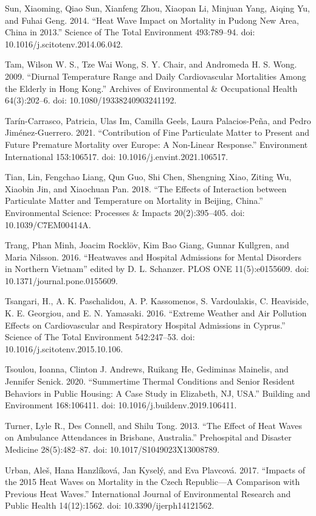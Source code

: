 \documentclass[12pt]{article}
\begin{document}
Sun, Xiaoming, Qiao Sun, Xianfeng Zhou, Xiaopan Li, Minjuan Yang, Aiqing
Yu, and Fuhai Geng. 2014. ``Heat Wave Impact on Mortality in Pudong New
Area, China in 2013.'' Science of The Total Environment 493:789--94.
doi: 10.1016/j.scitotenv.2014.06.042.

Tam, Wilson W. S., Tze Wai Wong, S. Y. Chair, and Andromeda H. S. Wong.
2009. ``Diurnal Temperature Range and Daily Cardiovascular Mortalities
Among the Elderly in Hong Kong.'' Archives of Environmental \&
Occupational Health 64(3):202--6. doi: 10.1080/19338240903241192.

Tarín-Carrasco, Patricia, Ulas Im, Camilla Geels, Laura Palacios-Peña,
and Pedro Jiménez-Guerrero. 2021. ``Contribution of Fine Particulate
Matter to Present and Future Premature Mortality over Europe: A
Non-Linear Response.'' Environment International 153:106517. doi:
10.1016/j.envint.2021.106517.

Tian, Lin, Fengchao Liang, Qun Guo, Shi Chen, Shengning Xiao, Ziting Wu,
Xiaobin Jin, and Xiaochuan Pan. 2018. ``The Effects of Interaction
between Particulate Matter and Temperature on Mortality in Beijing,
China.'' Environmental Science: Processes \& Impacts 20(2):395--405.
doi: 10.1039/C7EM00414A.

Trang, Phan Minh, Joacim Rocklöv, Kim Bao Giang, Gunnar Kullgren, and
Maria Nilsson. 2016. ``Heatwaves and Hospital Admissions for Mental
Disorders in Northern Vietnam'' edited by D. L. Schanzer. PLOS ONE
11(5):e0155609. doi: 10.1371/journal.pone.0155609.

Tsangari, H., A. K. Paschalidou, A. P. Kassomenos, S. Vardoulakis, C.
Heaviside, K. E. Georgiou, and E. N. Yamasaki. 2016. ``Extreme Weather
and Air Pollution Effects on Cardiovascular and Respiratory Hospital
Admissions in Cyprus.'' Science of The Total Environment 542:247--53.
doi: 10.1016/j.scitotenv.2015.10.106.

Tsoulou, Ioanna, Clinton J. Andrews, Ruikang He, Gediminas Mainelis, and
Jennifer Senick. 2020. ``Summertime Thermal Conditions and Senior
Resident Behaviors in Public Housing: A Case Study in Elizabeth, NJ,
USA.'' Building and Environment 168:106411. doi:
10.1016/j.buildenv.2019.106411.

Turner, Lyle R., Des Connell, and Shilu Tong. 2013. ``The Effect of Heat
Waves on Ambulance Attendances in Brisbane, Australia.'' Prehospital and
Disaster Medicine 28(5):482--87. doi: 10.1017/S1049023X13008789.

Urban, Aleš, Hana Hanzlíková, Jan Kyselý, and Eva Plavcová. 2017.
``Impacts of the 2015 Heat Waves on Mortality in the Czech Republic---A
Comparison with Previous Heat Waves.'' International Journal of
Environmental Research and Public Health 14(12):1562. doi:
10.3390/ijerph14121562.
\end{document}
